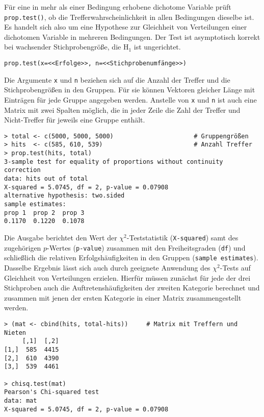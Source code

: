 Für eine in mehr als einer Bedingung erhobene dichotome Variable prüft \lstinline!prop.test()!, ob die Trefferwahrscheinlichkeit in allen Bedingungen dieselbe ist. Es handelt sich also um eine Hypothese zur Gleichheit von Verteilungen einer dichotomen Variable in mehreren Bedingungen. Der Test ist asymptotisch korrekt bei wachsender Stichprobengröße, die $\text{H}_{1}$ ist ungerichtet.
\begin{lstlisting}
prop.test(x=<<Erfolge>>, n=<<Stichprobenumfänge>>)
\end{lstlisting}

Die Argumente \lstinline!x! und \lstinline!n! beziehen sich auf die Anzahl der Treffer und die Stichprobengrößen in den Gruppen. Für sie können Vektoren gleicher Länge mit Einträgen für jede Gruppe angegeben werden. Anstelle von \lstinline!x! und \lstinline!n! ist auch eine Matrix mit zwei Spalten möglich, die in jeder Zeile die Zahl der Treffer und Nicht-Treffer für jeweils eine Gruppe enthält.
\begin{lstlisting}
> total <- c(5000, 5000, 5000)                      # Gruppengrößen
> hits  <- c(585, 610, 539)                         # Anzahl Treffer
> prop.test(hits, total)
3-sample test for equality of proportions without continuity correction
data: hits out of total
X-squared = 5.0745, df = 2, p-value = 0.07908
alternative hypothesis: two.sided
sample estimates:
prop 1  prop 2  prop 3
0.1170  0.1220  0.1078
\end{lstlisting}

Die Ausgabe berichtet den Wert der $\chi^{2}$-Teststatistik (\lstinline!X-squared!) samt des zugehörigen $p$-Wertes (\lstinline!p-value!) zusammen mit den Freiheitsgraden (\lstinline!df!) und schließlich die relativen Erfolgshäufigkeiten in den Gruppen (\lstinline!sample estimates!). Dasselbe Ergebnis lässt sich auch durch geeignete Anwendung des $\chi^{2}$-Tests auf Gleichheit von Verteilungen erzielen. Hierfür müssen zunächst für jede der drei Stichproben auch die Auftretenshäufigkeiten der zweiten Kategorie berechnet und zusammen mit jenen der ersten Kategorie in einer Matrix zusammengestellt werden.
\begin{lstlisting}
> (mat <- cbind(hits, total-hits))     # Matrix mit Treffern und Nieten
     [,1]  [,2]
[1,]  585  4415
[2,]  610  4390
[3,]  539  4461

> chisq.test(mat)
Pearson's Chi-squared test
data: mat
X-squared = 5.0745, df = 2, p-value = 0.07908
\end{lstlisting}

